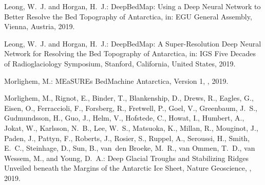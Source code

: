 \begin{thebibliography}{7}
Leong, W.~J. and Horgan, H.~J.: {{DeepBedMap}}: {{Using}} a Deep Neural Network
  to Better Resolve the Bed Topography of {{Antarctica}}, in: {{EGU General
  Assembly}}, {Vienna, Austria}, 2019{}.

Leong, W.~J. and Horgan, H.~J.: {{DeepBedMap}}: {{A}} Super-Resolution Deep
  Neural Network for Resolving the Bed Topography of {{Antarctica}}, in: {{IGS
  Five Decades}} of {{Radioglaciology Symposium}}, {Stanford, California,
  United States}, 2019{}.

Morlighem, M.: {{MEaSUREs BedMachine Antarctica}}, {{Version}} 1,
  , 2019.

Morlighem, M., Rignot, E., Binder, T., Blankenship, D., Drews, R., Eagles, G.,
  Eisen, O., Ferraccioli, F., Forsberg, R., Fretwell, P., Goel, V., Greenbaum,
  J.~S., Gudmundsson, H., Guo, J., Helm, V., Hofstede, C., Howat, I., Humbert,
  A., Jokat, W., Karlsson, N.~B., Lee, W.~S., Matsuoka, K., Millan, R.,
  Mouginot, J., Paden, J., Pattyn, F., Roberts, J., Rosier, S., Ruppel, A.,
  Seroussi, H., Smith, E.~C., Steinhage, D., Sun, B., van~den Broeke, M.~R.,
  van Ommen, T.~D., van Wessem, M., and Young, D.~A.: Deep Glacial Troughs and
  Stabilizing Ridges Unveiled beneath the Margins of the {{Antarctic}} Ice
  Sheet, Nature Geoscience, , 2019.

\end{thebibliography}

% 
